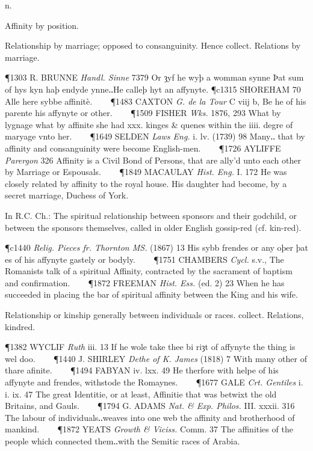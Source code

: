 \begin{description}[wide, labelwidth=!, labelindent=0pt]
  n.

\noindent  {}

\vspace{-0.3cm}

\begin{myenumerate}
 Affinity by position. 

 Relationship by marriage; opposed to consanguinity. Hence collect. Relations by marriage. 

\P 1303 R. BRUNNE \textit{Handl. Sinne} 7379 Or ȝyf he wyþ a womman synne Þat
sum of hys kyn haþ endyde ynne‥He calleþ hyt an affynyte.
\P c1315 SHOREHAM 70 Alle here sybbe affinitè.    
\P 1483 CAXTON \textit{G. de la Tour} C viij b, Be he of his parente his affynyte or other.    
\P 1509 FISHER \textit{Wks.} 1876, 293 What by lygnage what by affinite she had xxx. kinges \& quenes within the iiii. degre of maryage vnto her.    
\P 1649 SELDEN \textit{Laws Eng.} i. lv. (1739) 98 Many‥ that by affinity and consanguinity were become English-men.    
\P 1726 AYLIFFE \textit{Parergon} 326 Affinity is a Civil Bond of Persons, that are ally'd unto each other by Marriage or Espousals.    
\P 1849 MACAULAY \textit{Hist. Eng.} I. 172 He was closely related by affinity to the royal house. His daughter had become, by a secret marriage, Duchess of York.

 In R.C. Ch.: The spiritual relationship between sponsors and their godchild, or between the sponsors themselves, called in older English gossip-red (cf. kin-red). 

\P c1440 \textit{Relig. Pieces fr. Thornton MS.} (1867) 13 His sybb frendes or any oþer þat es of his affynyte gastely or bodyly.    
\P 1751 CHAMBERS \textit{Cycl.} s.v., The Romanists talk of a spiritual Affinity, contracted by the sacrament of baptism and confirmation.    
\P 1872 FREEMAN \textit{Hist. Ess.} (ed. 2) 23 When he has succeeded in placing the bar of spiritual affinity between the King and his wife.

 Relationship or kinship generally between individuals or races. collect. Relations, kindred. 

\P 1382 WYCLIF \textit{Ruth} iii. 13 If he wole take thee bi riȝt of affynyte the thing is wel doo.    
\P 1440 J. SHIRLEY \textit{Dethe of K. James} (1818) 7 With many other of thare afinite.    
\P 1494 FABYAN iv. lxx. 49 He therfore with helpe of his affynyte and frendes, withstode the Romaynes.    
\P 1677 GALE \textit{Crt. Gentiles} i. i. ix. 47 The great Identitie, or at least, Affinitie that was betwixt the old Britains, and Gauls.    
\P 1794 G. ADAMS \textit{Nat. \& Exp. Philos.} III. xxxii. 316 The labour of individuals‥weaves into one web the affinity and brotherhood of mankind.    
\P 1872 YEATS \textit{Growth \& Viciss.} Comm. 37 The affinities of the people which connected them‥with the Semitic races of Arabia.


\end{myenumerate}
\end{description}
